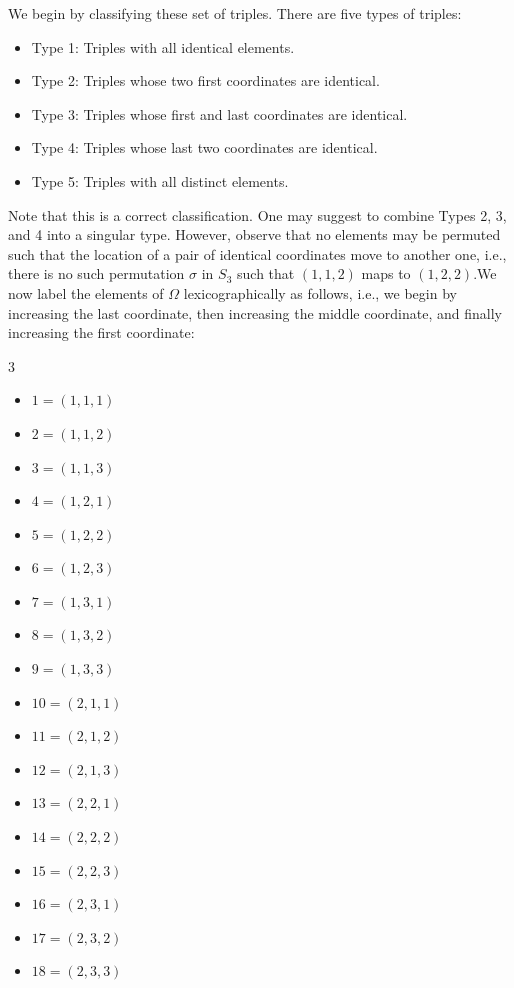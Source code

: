 \begin{solalph}
	\item We begin by classifying these set of triples. There are five types of triples:
	\begin{itemize}
		\item Type 1: Triples with all identical elements.
		\item Type 2: Triples whose two first coordinates are identical.
		\item Type 3: Triples whose first and last coordinates are identical.
		\item Type 4: Triples whose last two coordinates are identical.
		\item Type 5: Triples with all distinct elements.
	\end{itemize}
	Note that this is a correct classification. One may suggest to combine Types 2, 3, and 4 into a singular type. However, observe that no elements may be permuted such that the location of a pair of identical coordinates move to another one, i.e., there is no such permutation $\sigma$ in $S_3$ such that $(1, 1, 2)$ maps to $(1, 2, 2)$.We now label the elements of $\Omega$ lexicographically as follows, i.e., we begin by increasing the last coordinate, then increasing the middle coordinate, and finally increasing the first coordinate:
	\begin{multicols}{3}
		\begin{itemize}
			\item $1 = (1, 1, 1)$
			\item $2 = (1, 1, 2)$
			\item $3 = (1, 1, 3)$
			\item $4 = (1, 2, 1)$
			\item $5 = (1, 2, 2)$
			\item $6 = (1, 2, 3)$
			\item $7 = (1, 3, 1)$
			\item $8 = (1, 3, 2)$
			\item $9 = (1, 3, 3)$
			\item $10 = (2, 1, 1)$
			\item $11 = (2, 1, 2)$
			\item $12 = (2, 1, 3)$
			\item $13 = (2, 2, 1)$
			\item $14 = (2, 2, 2)$
			\item $15 = (2, 2, 3)$
			\item $16 = (2, 3, 1)$
			\item $17 = (2, 3, 2)$
			\item $18 = (2, 3, 3)$

\end{itemize}
\end{multicols}
\end{solalph}
